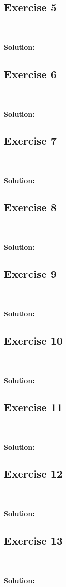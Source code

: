 \documentclass{article}
\begin{document}
\subsection*{Exercise 5}
\\\\
\textbf{Solution:}

\subsection*{Exercise 6}
\\\\
\textbf{Solution:}

\subsection*{Exercise 7}
\\\\
\textbf{Solution:}

\subsection*{Exercise 8}
\\\\
\textbf{Solution:}

\subsection*{Exercise 9}
\\\\
\textbf{Solution:}

\subsection*{Exercise 10}
\\\\
\textbf{Solution:}

\subsection*{Exercise 11}
\\\\
\textbf{Solution:}

\subsection*{Exercise 12}
\\\\
\textbf{Solution:}

\subsection*{Exercise 13}
\\\\
\textbf{Solution:}
\end{document}
